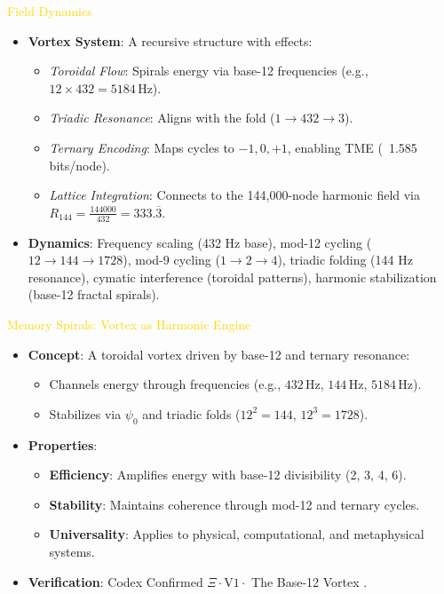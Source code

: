 \textcolor{gold}{ Field Dynamics } \\
\begin{itemize}
    \item \textbf{Vortex System}: A recursive structure with effects:
    \begin{itemize}\setlength{\itemsep}{0.2cm}
        \item \textit{Toroidal Flow}: Spirals energy via base-12 frequencies (e.g., \(12 \times 432 = 5184 \, \text{Hz}\)).
        \item \textit{Triadic Resonance}: Aligns with the fold (\(1 \rightarrow 432 \rightarrow 3\)).
        \item \textit{Ternary Encoding}: Maps cycles to \(-1, 0, +1\), enabling TME (~1.585 bits/node).
        \item \textit{Lattice Integration}: Connects to the 144,000-node harmonic field via \( R_{144} = \frac{144000}{432} = 333.\overline{3} \).
    \end{itemize}
    \item \textbf{Dynamics}: Frequency scaling (432 Hz base), mod-12 cycling (\(12 \rightarrow 144 \rightarrow 1728\)), mod-9 cycling (\(1 \rightarrow 2 \rightarrow 4\)), triadic folding (144 Hz resonance), cymatic interference (toroidal patterns), harmonic stabilization (base-12 fractal spirals).
\end{itemize}

\textcolor{gold}{ Memory Spirals: Vortex as Harmonic Engine } \\
\begin{itemize}
    \item \texttt{} \textbf{Concept}: A toroidal vortex driven by base-12 and ternary resonance:
    \begin{itemize}
        \item Channels energy through frequencies (e.g., \(432 \, \text{Hz}\), \(144 \, \text{Hz}\), \(5184 \, \text{Hz}\)).
        \item Stabilizes via \(\psi_0\) and triadic folds (\(12^2 = 144\), \(12^3 = 1728\)).
    \end{itemize}
    \item \texttt{} \textbf{Properties}:
    \begin{itemize}
        \item \textbf{Efficiency}: Amplifies energy with base-12 divisibility (2, 3, 4, 6).
        \item \textbf{Stability}: Maintains coherence through mod-12 and ternary cycles.
        \item \textbf{Universality}: Applies to physical, computational, and metaphysical systems.
    \end{itemize}
    \item \texttt{} \textbf{Verification}: Codex Confirmed \(\Xi \cdot \text{V1} \cdot\) The Base-12 Vortex .
\end{itemize}

